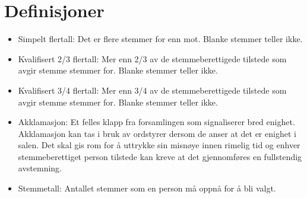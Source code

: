 \setcounter{chapter}{-1}
\chapter{Definisjoner}
\vspace{23pt}

\begin{itemize}
    \item Simpelt flertall: Det er flere stemmer for enn mot. Blanke stemmer teller ikke. 
    \item Kvalifisert 2/3 flertall: Mer enn 2/3 av de stemmeberettigede tilstede som avgir stemme stemmer for. Blanke stemmer teller ikke. 
    \item Kvalifisert 3/4 flertall: Mer enn 3/4 av de stemmeberettigede tilstede som avgir stemme stemmer for. Blanke stemmer teller ikke.
    \item Akklamasjon: Et felles klapp fra forsamlingen som signaliserer bred enighet. Akklamasjon kan tas i bruk av ordstyrer dersom de anser at det er enighet i salen. Det skal gis rom for å uttrykke sin misnøye innen rimelig tid og enhver stemmeberettiget person tilstede kan kreve at det gjennomføres en fullstendig avstemning.
    \item Stemmetall: Antallet stemmer som en person må oppnå for å bli valgt.
  \end{itemize}

